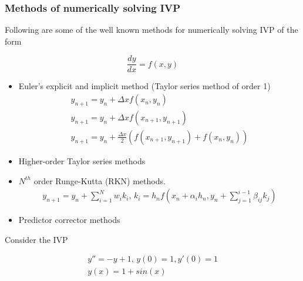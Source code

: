\documentclass{beamer}
\begin{document}
\begin{frame}
	\frametitle{Methods of numerically solving IVP}
	
	Following are some of the well known methods for numerically solving IVP of the form
	
	\begin{equation}
	 \frac{d y}{dx} = f(x,y)
	\end{equation} 
	
	\begin{itemize}
		\item Euler's explicit and implicit method (Taylor series method of order 1) 
		\begin{eqnarray}
			y_{n+1} = y_{n} + \Delta x f(x_{n}, y_{n})\\
			y_{n+1} = y_{n} + \Delta x f(x_{n+1}, y_{n+1})\\
			y_{n+1} = y_{n} + \frac{\Delta x}{2} \left(  f(x_{n+1}, y_{n+1}) + f(x_{n}, y_{n})\right)
		\end{eqnarray}
		\item Higher-order Taylor series methods
		\item $N^{th}$ order Runge-Kutta (RKN) methods.
		\begin{eqnarray}
		y_{n+1} = y_n +  \sum_{i=1}^{N}  w_i k_i\text{,      }  k_i  = h_n f \left( x_n + \alpha_i h_n, y_n + \sum_{j=1}^{i-1} \beta_{ij}k_j  \right)   
		\end{eqnarray}
		\item Predictor corrector methods
	\end{itemize}	
\end{frame}

\begin{frame}
	Consider the IVP

	\begin{eqnarray*}
     y'' = -y +1 \text{,             } y(0) =1, y'(0) =1 \\
     y(x)  = 1 + sin(x)  
	\end{eqnarray*}	
	
\end{frame}
\end{document}
